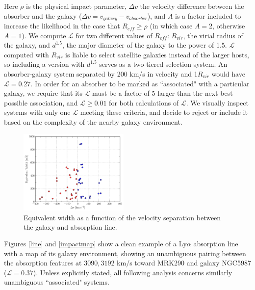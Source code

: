 \documentclass[iop]{emulateapj-rtx4}
\begin{document}
\noindent Here $\rho$ is the physical impact parameter, $\Delta v$ the velocity difference between the absorber and the galaxy ($\Delta v = v_{galaxy} - v_{absorber}$), and $A$ is a factor included to increase the likelihood in the case that $R_{eff} \geq \rho$ (in which case $A = 2$, otherwise $A = 1$). We compute $\mathcal{L}$ for two different values of $R_{eff}$: $R_{vir}$, the virial radius of the galaxy, and $d^{1.5}$, the major diameter of the galaxy to the power of 1.5. $\mathcal{L}$ computed with $R_{vir}$ is liable to select satellite galaxies instead of the larger hosts, so including a version with $d^{1.5}$ serves as a two-tiered selection system. An absorber-galaxy system separated by 200 km/s in velocity and 1$R_{vir}$ would have $\mathcal{L} = 0.27$. In order for an absorber to be marked as ``associated" with a particular galaxy, we require that its $\mathcal{L}$ must be a factor of 5 larger than the next best possible association, and $\mathcal{L} \ge 0.01$ for both calculations of $\mathcal{L}$. We visually inspect systems with only one $\mathcal{L}$ meeting these criteria, and decide to reject or include it based on the complexity of the nearby galaxy environment. 


\begin{figure}[h!]
        \centering
        \includegraphics[width=0.48\textwidth]{W(vel_diff).pdf}
        \caption{\small{Equivalent width as a function of the velocity separation between the galaxy and absorption line.}}
        \label{W_veldif}
        \vspace{5pt}
\end{figure} 

Figures \ref{line} and \ref{impactmap} show a clean example of a Ly$\alpha$ absorption line with a map of its galaxy environment, showing an unambiguous pairing between the absorption features at $3090, 3192$ km/s toward MRK290 and galaxy NGC5987 ($\mathcal{L} = 0.37$). Unless explicitly stated, all following analysis concerns similarly unambiguous ``associated" systems. 
\end{document}
